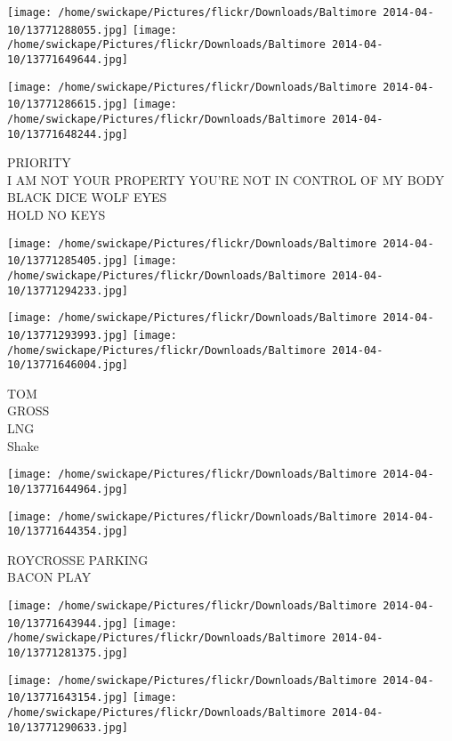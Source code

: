 \documentclass[10pt,letterpaper]{article}
\begin{document}
\texttt{[image: /home/swickape/Pictures/flickr/Downloads/Baltimore 2014-04-10/13771288055.jpg]}
\texttt{[image: /home/swickape/Pictures/flickr/Downloads/Baltimore 2014-04-10/13771649644.jpg]}

\texttt{[image: /home/swickape/Pictures/flickr/Downloads/Baltimore 2014-04-10/13771286615.jpg]}
\texttt{[image: /home/swickape/Pictures/flickr/Downloads/Baltimore 2014-04-10/13771648244.jpg]}

PRIORITY\\
I AM NOT YOUR PROPERTY YOU'RE NOT IN CONTROL OF MY BODY\\
BLACK DICE WOLF EYES\\
HOLD NO KEYS\\
\pagebreak

\texttt{[image: /home/swickape/Pictures/flickr/Downloads/Baltimore 2014-04-10/13771285405.jpg]}
\texttt{[image: /home/swickape/Pictures/flickr/Downloads/Baltimore 2014-04-10/13771294233.jpg]}

\texttt{[image: /home/swickape/Pictures/flickr/Downloads/Baltimore 2014-04-10/13771293993.jpg]}
\texttt{[image: /home/swickape/Pictures/flickr/Downloads/Baltimore 2014-04-10/13771646004.jpg]}

TOM\\
GROSS\\
LNG\\
Shake\\
\pagebreak

\texttt{[image: /home/swickape/Pictures/flickr/Downloads/Baltimore 2014-04-10/13771644964.jpg]}

\vspace{0.25in}
\texttt{[image: /home/swickape/Pictures/flickr/Downloads/Baltimore 2014-04-10/13771644354.jpg]}

ROYCROSSE PARKING\\
BACON PLAY\\
\pagebreak

\texttt{[image: /home/swickape/Pictures/flickr/Downloads/Baltimore 2014-04-10/13771643944.jpg]}
\texttt{[image: /home/swickape/Pictures/flickr/Downloads/Baltimore 2014-04-10/13771281375.jpg]}

\texttt{[image: /home/swickape/Pictures/flickr/Downloads/Baltimore 2014-04-10/13771643154.jpg]}
\texttt{[image: /home/swickape/Pictures/flickr/Downloads/Baltimore 2014-04-10/13771290633.jpg]}
\end{document}
